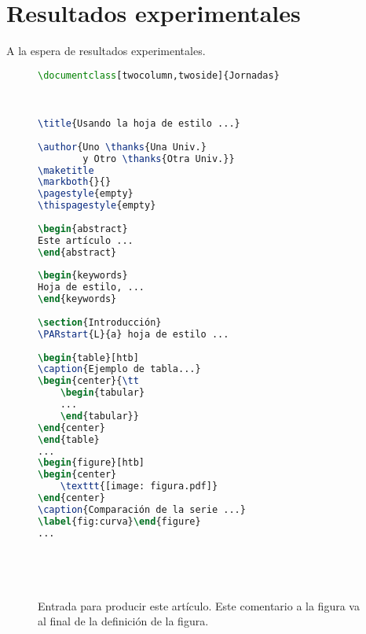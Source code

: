 \section{Resultados experimentales}

A la espera de resultados experimentales.


\begin{figure}[!t]
    \centering
    \begin{minipage}{\linewidth}
    {\footnotesize
    \begin{lstlisting}[language=TeX]
\documentclass[twocolumn,twoside]{Jornadas}  

 
    
\title{Usando la hoja de estilo ...} 
    
\author{Uno \thanks{Una Univ.}
        y Otro \thanks{Otra Univ.}} 
\maketitle
\markboth{}{}
\pagestyle{empty} 
\thispagestyle{empty}
    
\begin{abstract} 
Este artículo ... 
\end{abstract} 
    
\begin{keywords} 
Hoja de estilo, ... 
\end{keywords} 
    
\section{Introducción} 
\PARstart{L}{a} hoja de estilo ... 
    
\begin{table}[htb] 
\caption{Ejemplo de tabla...} 
\begin{center}{\tt 
    \begin{tabular} 
    ... 
    \end{tabular}} 
\end{center} 
\end{table} 
... 
\begin{figure}[htb] 
\begin{center} 
    \texttt{[image: figura.pdf]} 
\end{center} 
\caption{Comparación de la serie ...} 
\label{fig:curva}\end{figure} 
... 

 
 
 
    \end{lstlisting}
    }
    \end{minipage}
    \caption{Entrada para producir este artículo. Este comentario a la figura 
    va al final de la definición de la figura.}
    \label{fig:programa}
    \end{figure}